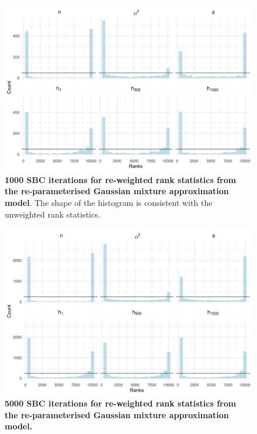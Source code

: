 \documentclass[12pt, a4paper]{article}
\begin{document}
\begin{figure}[H]
    \centering
    \includegraphics[scale=0.09]{results/weighted_ksc_ncp_1k.png}
    \caption{\textbf{1000 SBC iterations for re-weighted rank statistics from the re-parameterised Gaussian mixture approximation model}. The shape of the histogram is consistent with the unweighted rank statistics.}
    \label{fig:ncpreweight1k}
\end{figure}

\begin{figure}[H]
    \centering
    \includegraphics[scale=0.09]{results/weighted_ksc_ncp_5k.png}
    \caption{\textbf{5000 SBC iterations for re-weighted rank statistics from the re-parameterised Gaussian mixture approximation model.}}
    \label{fig:ncpreweight5k}
\end{figure}
\end{document}
